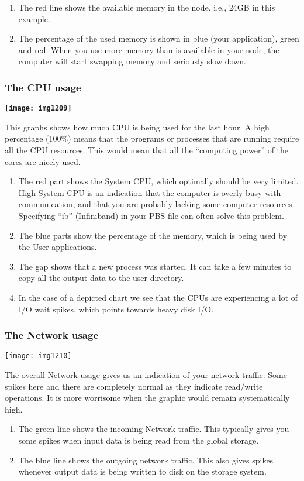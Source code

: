 \begin{enumerate}
\item  The red line shows the available memory in the node, i.e., 24GB in this example.
\item  The percentage of the used memory is shown in blue (your application),
  green and red.  When you use more memory than is available in your node, the
  computer will start swapping memory and seriously slow down.
\end{enumerate}


\subsubsection{The CPU usage}

\textbf{\texttt{[image: img1209]}}

This graphs shows how much CPU is being used for the last hour. A high
percentage (100\%) means that the programs or processes that are running
require all the CPU resources. This would mean that all the ``computing power''
of the cores are nicely used.

\begin{enumerate}
\item  The red part shows the System CPU, which optimally should be very
  limited. High System CPU is an indication that the computer is overly busy
  with communication, and that you are probably lacking some computer
  resources.  Specifying ``ib'' (Infiniband) in your PBS file can often solve
  this problem.
\item  The blue parts show the percentage of the memory, which is being used by
  the User applications.
\item  The gap shows that a new process was started. It can take a few minutes
  to copy all the output data to the user directory.
\item  In the case of a depicted chart we see that the CPUs are experiencing a
  lot of I/O wait spikes, which points towards heavy disk I/O.
\end{enumerate}

\subsubsection{The Network usage}

\texttt{[image: img1210]}

The overall Network usage gives us an indication of your network traffic. Some
spikes here and there are completely normal as they indicate read/write
operations. It is more worrisome when the graphic would remain systematically
high.

\begin{enumerate}
\item  The green line shows the incoming Network traffic. This typically gives
  you some spikes when input data is being read from the global storage.
\item  The blue line shows the outgoing network traffic. This also gives spikes
  whenever output data is being written to disk on the storage system.
\end{enumerate}
